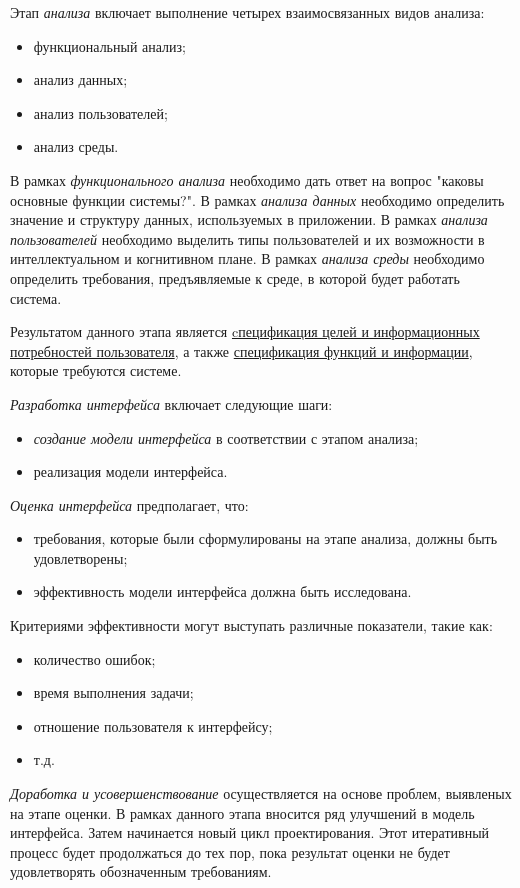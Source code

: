 Этап \textit{анализа} включает выполнение четырех взаимосвязанных видов анализа:
\begin{itemize}
    \item функциональный анализ;
    \item анализ данных;
    \item анализ пользователей;
    \item анализ среды.
\end{itemize}

В рамках \textit{функционального анализа} необходимо дать ответ на вопрос "каковы основные функции системы?".
В рамках \textit{анализа данных} необходимо определить значение и структуру данных, используемых в приложении.
В рамках \textit{анализа пользователей} необходимо выделить типы пользователей и их возможности в интеллектуальном
и когнитивном плане.
В рамках \textit{анализа среды} необходимо определить требования, предъявляемые к среде, в которой будет работать система.

Результатом данного этапа является \uline{cпецификация целей и информационных потребностей пользователя}, а также
\uline{спецификация функций и информации}, которые требуются системе.

\textit{Разработка интерфейса} включает следующие шаги:
\begin{itemize}
	\item \textit{создание модели интерфейса} в соответствии с этапом анализа;
	\item реализация модели интерфейса.
\end{itemize}

\textit{Оценка интерфейса} предполагает, что:
\begin{itemize}
	\item требования, которые были сформулированы на этапе анализа, должны быть удовлетворены;
	\item эффективность модели интерфейса должна быть исследована.
\end{itemize}

Критериями эффективности могут выступать различные показатели, такие как:
\begin{itemize}
	\item количество ошибок;
	\item время выполнения задачи;
	\item отношение пользователя к интерфейсу;
	\item т.д.
\end{itemize}

\textit{Доработка и усовершенствование} осуществляется на основе проблем, выявленых на этапе оценки. В рамках данного этапа вносится ряд улучшений в модель интерфейса. Затем начинается новый цикл проектирования. Этот итеративный процесс будет продолжаться до тех пор, пока результат оценки не будет удовлетворять обозначенным требованиям. 

